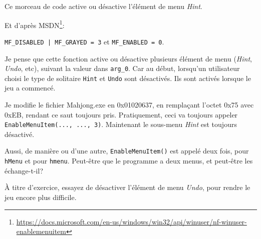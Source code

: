 Ce morceau de code active ou désactive l'élément de menu \emph{Hint}.

Et d'après MSDN\footnote{\url{https://docs.microsoft.com/en-us/windows/win32/api/winuser/nf-winuser-enablemenuitem}}:

\verb$MF_DISABLED | MF_GRAYED = 3$ et \verb|MF_ENABLED = 0|.

Je pense que cette fonction active ou désactive plusieurs élément de menu (\emph{Hint},
\emph{Undo}, etc), suivant la valeur dans \verb|arg_0|.
Car au début, lorsqu'un utilisateur choisi le type de solitaire \verb|Hint| et
\verb|Undo| sont désactivés.
Ils sont activés lorsque le jeu a commencé.

Je modifie le fichier Mahjong.exe en 0x01020637, en remplaçant l'octet 0x75 avec
0xEB, rendant ce saut  toujours pris.
Pratiquement, ceci va toujours appeler \verb|EnableMenuItem(..., ..., 3)|.
Maintenant le sous-menu \emph{Hint} est toujours désactivé.

Aussi, de manière ou d'une autre, \verb|EnableMenuItem()| est appelé deux fois,
pour \verb|hMenu| et pour \verb|hmenu|.
Peut-être que le programme a deux menus, et peut-être les échange-t-il?

À titre d'exercice, essayez de désactiver l'élément de menu \emph{Undo}, pour rendre
le jeu encore plus difficile.
